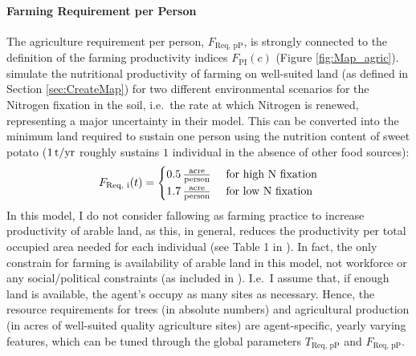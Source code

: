 \paragraph{Farming Requirement per Person}
The agriculture requirement per person, $F_\text{Req, pP}$, is strongly connected to the definition of the farming productivity indices $F_\text{PI}(c)$ (Figure \ref{fig:Map_agric}).
\citet{Puleston2017} simulate the nutritional productivity of farming on well-suited land (as defined in Section \ref{sec:CreateMap}) for two different environmental scenarios for the Nitrogen fixation in the soil, i.e.\ the rate at which Nitrogen is renewed, representing a major uncertainty in their model.
This can be converted into the minimum land required to sustain one person using the nutrition content of sweet potato ($1\, \rm{t/yr}$ roughly sustains $1$ individual in the absence of other food sources): 
\begin{equation}
F_\text{Req, i}(t) = \begin{cases}
	0.5 \, {\rm \frac{acre}{person} } & \text{ for high N fixation} \\
	1.7 \, {\rm \frac{acre}{person} } & \text{ for low N fixation} \\
 \end{cases}
\end{equation}
In this model, I do not consider fallowing as farming practice to increase productivity of arable land, as this, in general, reduces the productivity per total occupied area needed for each individual (see Table 1 in \citet{Puleston2017}).
In fact, the only constrain for farming is availability of arable land in this model, not workforce or any social/political constraints (as included in \citet{Puleston2017}).
I.e.\ I assume that, if enough land is available, the agent's occupy as many sites as necessary.
Hence, the resource requirements for trees (in absolute numbers) and agricultural production (in acres of well-suited quality agriculture sites) are agent-specific, yearly varying features, which can be tuned through the global parameters $T_\text{Req, pP}$ and $F_\text{Req, pP}$.

